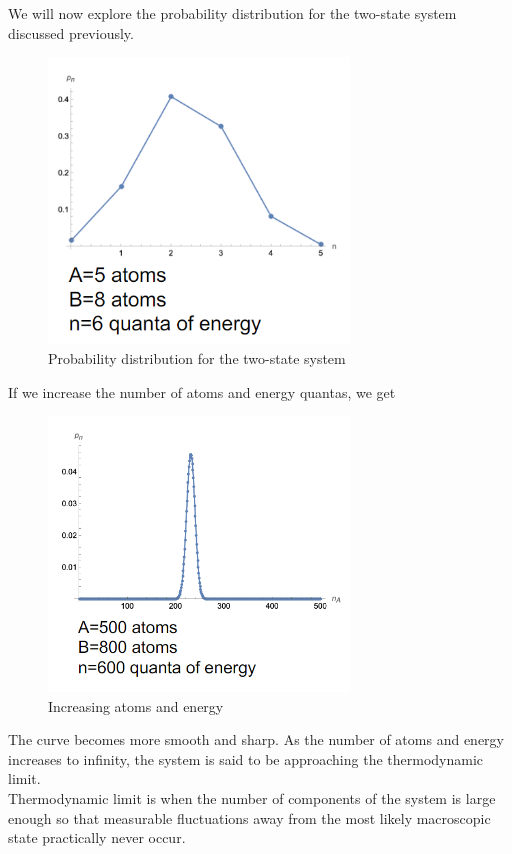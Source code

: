 We will now explore the probability distribution for the two-state system discussed previously.

\begin{figure}[H]
	\centering
	\includegraphics[width=80mm]{8.png}
	\caption{Probability distribution for the two-state system}
\end{figure}

If we increase the number of atoms and energy quantas, we get

\begin{figure}[H]
	\centering
	\includegraphics[width=80mm]{9.png}
	\caption{Increasing atoms and energy}
\end{figure}

The curve becomes more smooth and sharp. As the number of atoms and energy increases to infinity, the system is said to be approaching the thermodynamic limit. \\

Thermodynamic limit is when the number of components of the system is large enough so that measurable fluctuations away from the most likely macroscopic state practically never occur. \\

